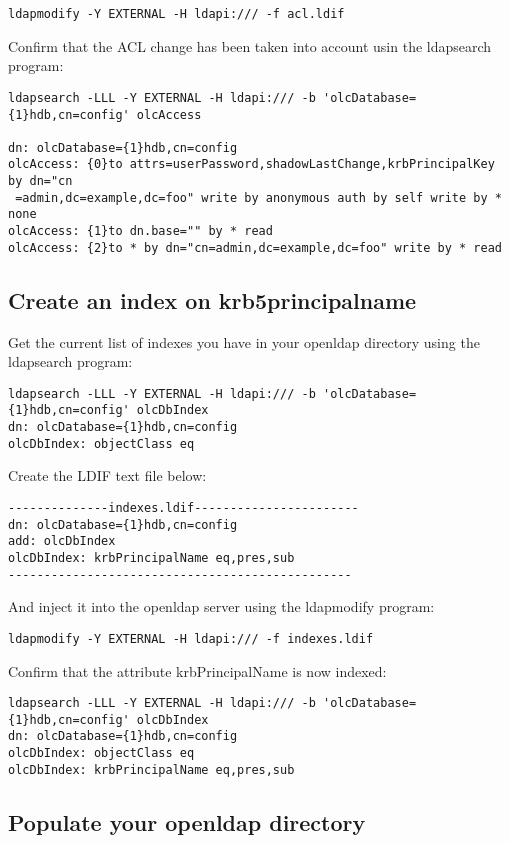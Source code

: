 \documentclass[12pt,a4]{article}
\begin{document}
\begin{verbatim}
ldapmodify -Y EXTERNAL -H ldapi:/// -f acl.ldif
\end{verbatim}
Confirm that the ACL change has been taken into account usin the  ldapsearch program:
\begin{verbatim}
ldapsearch -LLL -Y EXTERNAL -H ldapi:/// -b 'olcDatabase={1}hdb,cn=config' olcAccess

dn: olcDatabase={1}hdb,cn=config
olcAccess: {0}to attrs=userPassword,shadowLastChange,krbPrincipalKey by dn="cn
 =admin,dc=example,dc=foo" write by anonymous auth by self write by * none
olcAccess: {1}to dn.base="" by * read
olcAccess: {2}to * by dn="cn=admin,dc=example,dc=foo" write by * read
\end{verbatim}



\subsection{Create an index on krb5principalname}

Get the current list of indexes you have in your openldap directory using the ldapsearch program:

\begin{verbatim}
ldapsearch -LLL -Y EXTERNAL -H ldapi:/// -b 'olcDatabase={1}hdb,cn=config' olcDbIndex
dn: olcDatabase={1}hdb,cn=config
olcDbIndex: objectClass eq
\end{verbatim}

Create the LDIF text file below:
\begin{verbatim}
--------------indexes.ldif-----------------------
dn: olcDatabase={1}hdb,cn=config
add: olcDbIndex
olcDbIndex: krbPrincipalName eq,pres,sub
------------------------------------------------
\end{verbatim}

And inject it into the openldap server using the ldapmodify program:
\begin{verbatim}
ldapmodify -Y EXTERNAL -H ldapi:/// -f indexes.ldif
\end{verbatim}
Confirm that the attribute krbPrincipalName is now indexed:
\begin{verbatim}
ldapsearch -LLL -Y EXTERNAL -H ldapi:/// -b 'olcDatabase={1}hdb,cn=config' olcDbIndex
dn: olcDatabase={1}hdb,cn=config
olcDbIndex: objectClass eq
olcDbIndex: krbPrincipalName eq,pres,sub
\end{verbatim}


\subsection{Populate your openldap directory}
\end{document}
